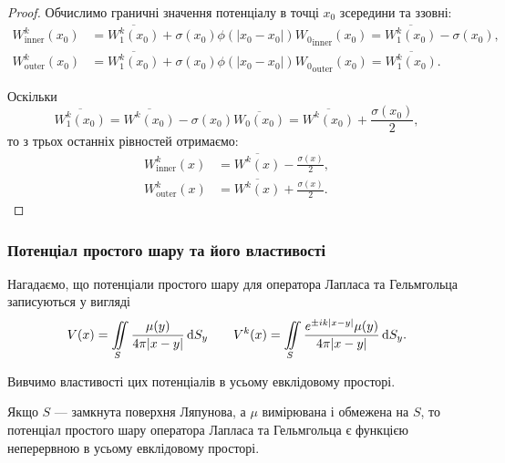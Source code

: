 \begin{proof}
	Обчислимо граничні значення потенціалу в точці $x_0$ зсередини та ззовні:
	\begin{align}
		W_{\text{inner}}^k(x_0) &= \overline{W_1^k(x_0)} + \sigma(x_0) \phi(|x_0 - x_0|) {W_{0}}_{\text{inner}}(x_0) = \overline{W_1^k(x_0)} - \sigma(x_0), \\
		W_{\text{outer}}^k(x_0) &= \overline{W_1^k(x_0)} + \sigma(x_0) \phi(|x_0 - x_0|) {W_{0}}_{\text{outer}}(x_0) = \overline{W_1^k(x_0)}.
	\end{align}

	Оскільки
	\begin{equation}
		\overline{W_1^k(x_0)} = \overline{W^k(x_0)} - \sigma(x_0) \overline{W_0(x_0)} = \overline{W^k(x_0)} + \frac{\sigma(x_0)}{2},
	\end{equation}
	то з трьох останніх рівностей отримаємо:
	\begin{align}
		W_{\text{inner}}^k(x) &= \overline{W^k(x)} - \frac{\sigma(x)}{2}, \\
		W_{\text{outer}}^k(x) &= \overline{W^k(x)} + \frac{\sigma(x)}{2}.
	\end{align}
\end{proof}

\subsubsection{Потенціал простого шару та його властивості}

Нагадаємо, що потенціали простого шару для оператора Лапласа та Гельмгольца записуються у вигляді 
\begin{equation}
	V(x) = \displaystyle\iint\limits_S \frac{\mu(y)}{4 \pi |x - y|} \mathop{}\!\mathrm{d} S_y \qquad V^k(x) = \displaystyle\iint\limits_S \frac{e^{\pm i k |x - y|} \mu(y)}{4 \pi |x - y|} \mathop{}\!\mathrm{d} S_y.
\end{equation}

Вивчимо властивості цих потенціалів в усьому евклідовому просторі.

\begin{theorem}
	Якщо $S$ --- замкнута поверхня Ляпунова, а $\mu$ вимірювана і обмежена на $S$, то потенціал простого шару оператора Лапласа та Гельмгольца є функцією неперервною в усьому евклідовому просторі.
\end{theorem}

